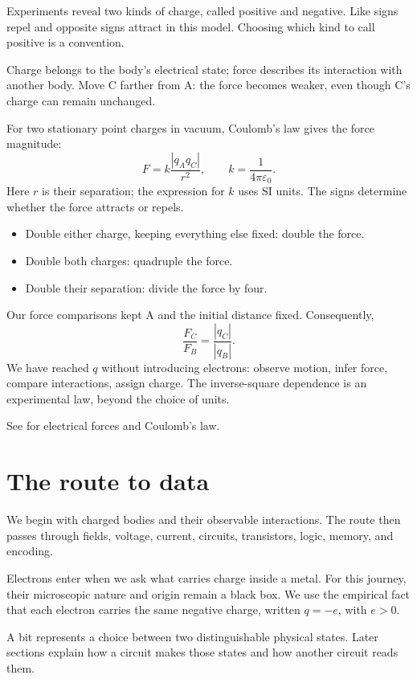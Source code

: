 Experiments reveal two kinds of charge,
called positive and negative. Like
signs repel and opposite signs attract
in this model. Choosing which kind
to call positive is a convention.

Charge belongs to the body's electrical
state; force describes its interaction
with another body. Move C farther
from A: the force becomes weaker,
even though C's charge can remain
unchanged.

For two stationary point charges in
vacuum, Coulomb's law gives the force
magnitude:
$$
F=k\frac{|q_Aq_C|}{r^2},
\qquad
k=\frac{1}{4\pi\varepsilon_0}.
$$
Here $r$ is their separation; the
expression for $k$ uses SI units.
The signs determine whether the force
attracts or repels.

\begin{itemize}
\item Double either charge, keeping
everything else fixed: double the force.
\item Double both charges: quadruple
the force.
\item Double their separation: divide
the force by four.
\end{itemize}

Our force comparisons kept A and the
initial distance fixed. Consequently,
$$
\frac{F_C}{F_B}
=\frac{|q_C|}{|q_B|}.
$$
We have reached $q$ without introducing
electrons: observe motion, infer force,
compare interactions, assign charge.
The inverse-square dependence is an
experimental law, beyond the choice
of units.

See \cite[Vol. II, Section 1-1]
{feynman-lectures} for electrical forces
and Coulomb's law.

\section{The route to data}

We begin with charged bodies and their
observable interactions. The route then
passes through fields, voltage, current,
circuits, transistors, logic, memory,
and encoding.

Electrons enter when we ask what carries
charge inside a metal. For this journey,
their microscopic nature and origin
remain a black box. We use the empirical
fact that each electron carries the same
negative charge, written $q=-e$, with
$e>0$.

A bit represents a choice between two
distinguishable physical states. Later
sections explain how a circuit makes
those states and how another circuit
reads them.

